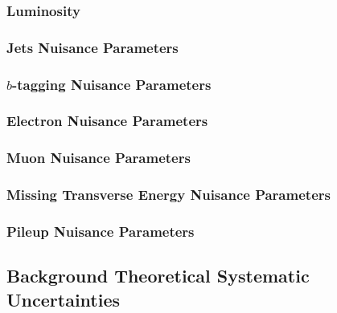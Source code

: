 \documentclass[10pt,twoside,cucitura,classica,english,openany]{toptesi}
\begin{document}


\subsubsection{Luminosity}
\label{sec:luminosity}



\subsubsection{Jets Nuisance Parameters}
\label{sec:jets-nuis-param}



\subsubsection{$b$-tagging Nuisance Parameters}
\label{sec:b-tagging-nuisance}



\subsubsection{Electron Nuisance Parameters}
\label{sec:electr-nuis-param}



\subsubsection{Muon Nuisance Parameters}
\label{sec:muon-nuis-param}



\subsubsection{Missing Transverse Energy Nuisance Parameters}
\label{sec:met-np}



\subsubsection{Pileup Nuisance Parameters}
\label{sec:pile-nuis-param}



\subsection{Background Theoretical Systematic Uncertainties}
\label{sec:backgr-theor-syst}
\end{document}
